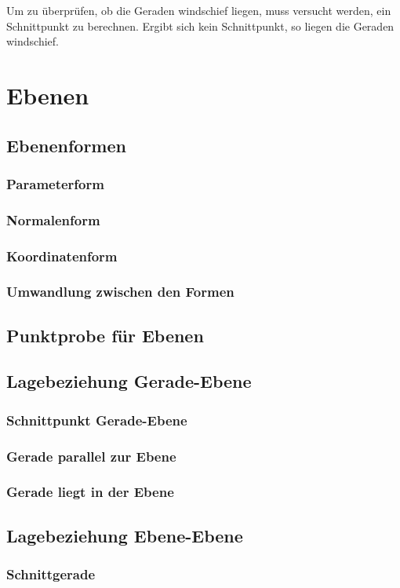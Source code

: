 Um zu überprüfen, ob die Geraden windschief liegen, muss versucht werden, ein Schnittpunkt
zu berechnen. Ergibt sich kein Schnittpunkt, so liegen die Geraden windschief.

\section{Ebenen}
\subsection{Ebenenformen}
\subsubsection{Parameterform}
\subsubsection{Normalenform}
\subsubsection{Koordinatenform}
\subsubsection{Umwandlung zwischen den Formen}
\subsection{Punktprobe für Ebenen}
\subsection{Lagebeziehung Gerade-Ebene}
\subsubsection{Schnittpunkt Gerade-Ebene}
\subsubsection{Gerade parallel zur Ebene}
\subsubsection{Gerade liegt in der Ebene}
\subsection{Lagebeziehung Ebene-Ebene}
\subsubsection{Schnittgerade}
